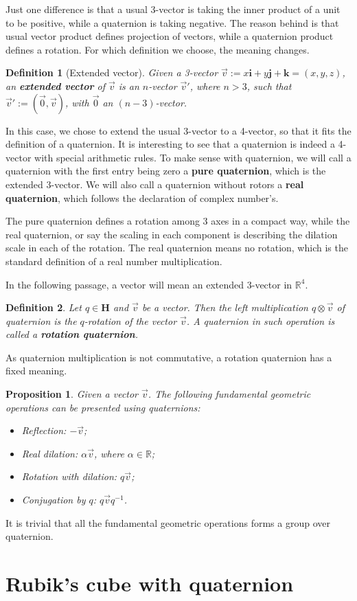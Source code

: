 \documentclass[12pt]{article}
\newtheorem*{definition}{Definition}
\newtheorem*{proposition}{Proposition}
\begin{document}
    Just one difference is that a usual 3-vector is taking the inner product of a unit to be positive, while a quaternion is taking negative. The reason behind is that usual vector product defines projection of vectors, while a quaternion product defines a rotation. For which definition we choose, the meaning changes.

    \begin{definition}[Extended vector]
        Given a 3-vector $\vec{v}:=x\mathbf{i}+y\mathbf{j}+\mathbf{k}=(x,y,z)$, an \textbf{extended vector} of $\vec{v}$ is an $n$-vector $\vec{v}'$, where $n>3$, such that $\vec{v}':=(\vec{0},\vec{v})$, with $\vec{0}$ an $(n-3)$-vector.
    \end{definition}

    In this case, we chose to extend the usual 3-vector to a 4-vector, so that it fits the definition of a quaternion. It is interesting to see that a quaternion is indeed a 4-vector with special arithmetic rules. To make sense with quaternion, we will call a quaternion with the first entry being zero a \textbf{pure quaternion}, which is the extended 3-vector. We will also call a quaternion without rotors a \textbf{real quaternion}, which follows the declaration of complex number's.

    The pure quaternion defines a rotation among 3 axes in a compact way, while the real quaternion, or say the scaling in each component is describing the dilation scale in each of the rotation. The real quaternion means no rotation, which is the standard definition of a real number multiplication.

    In the following passage, a vector will mean an extended 3-vector in $\mathbb{R}^4$.

    \begin{definition}
        Let $q\in\mathbf{H}$ and $\vec{v}$ be a vector. Then the left multiplication $q\otimes \vec{v}$ of quaternion is the $q$-rotation of the vector $\vec{v}$. A quaternion in such operation is called a \textbf{rotation quaternion}.
    \end{definition}

    As quaternion multiplication is not commutative, a rotation quaternion has a fixed meaning.

    \begin{proposition}
        Given a vector $\vec{v}$. The following fundamental geometric operations can be presented using quaternions:\begin{itemize}
            \item Reflection: $-\vec{v}$;
            \item Real dilation: $\alpha\vec{v}$, where $\alpha\in\mathbb{R}$;
            \item Rotation with dilation: $q\vec{v}$;
            \item Conjugation by $q$: $q\vec{v}q^{-1}$.
        \end{itemize}
    \end{proposition}

    It is trivial that all the fundamental geometric operations forms a group over quaternion.



    \section{Rubik's cube with quaternion}
\end{document}
